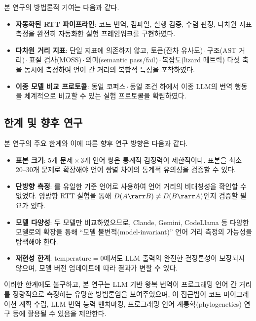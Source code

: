 본 연구의 방법론적 기여는 다음과 같다.

\begin{itemize}[leftmargin=2em]
  \item \textbf{자동화된 RTT 파이프라인}:
    코드 번역, 컴파일, 실행 검증, 수렴 판정, 다차원 지표 측정을 완전히
    자동화한 실험 프레임워크를 구현하였다.

  \item \textbf{다차원 거리 지표}:
    단일 지표에 의존하지 않고, 토큰(잔차 유사도)\,$\cdot$\,구조(AST
    거리)\,$\cdot$\,표절 검사(MOSS)\,$\cdot$\,의미(semantic
    pass/fail)\,$\cdot$\,복잡도(lizard 메트릭) 다섯 축을 동시에 측정하여
    언어 간 거리의 복합적 특성을 포착하였다.

  \item \textbf{이종 모델 비교 프로토콜}:
    동일 코퍼스\,$\cdot$\,동일 조건 하에서 이종 LLM의 번역 행동을 체계적으로
    비교할 수 있는 실험 프로토콜을 확립하였다.
\end{itemize}

\subsection{한계 및 향후 연구}\label{ssec:limitations}

본 연구의 주요 한계와 이에 따른 향후 연구 방향은 다음과 같다.

\begin{itemize}[leftmargin=2em]
  \item \textbf{표본 크기}:
    5개 문제\,$\times$\,3개 언어 쌍은 통계적 검정력이 제한적이다.
    표본을 최소 20--30개 문제로 확장해야 언어 쌍별 차이의 통계적 유의성을
    검증할 수 있다.

  \item \textbf{단방향 측정}:
    \cpp{}를 유일한 기준 언어로 사용하여 언어 거리의 비대칭성을 확인할 수
    없었다. 양방향 RTT 실험을 통해
    $D(A \rarr B) \neq D(B \rarr A)$인지 검증할 필요가 있다.

  \item \textbf{모델 다양성}:
    두 모델만 비교하였으므로, Claude, Gemini, CodeLlama 등 다양한 모델로의
    확장을 통해 ``모델 불변적(model-invariant)'' 언어 거리 측정의 가능성을
    탐색해야 한다.

  \item \textbf{재현성 한계}:
    $\text{temperature}=0$에서도 LLM 출력의 완전한 결정론성이 보장되지 않으며,
    모델 버전 업데이트에 따라 결과가 변할 수 있다.
\end{itemize}

이러한 한계에도 불구하고, 본 연구는 LLM 기반 왕복 번역이 프로그래밍 언어 간
거리를 정량적으로 측정하는 유망한 방법론임을 보여주었으며, 이 접근법이
코드 마이그레이션 계획 수립, LLM 번역 능력 벤치마킹, 프로그래밍 언어
계통학(phylogenetics) 연구 등에 활용될 수 있음을 제안한다.
